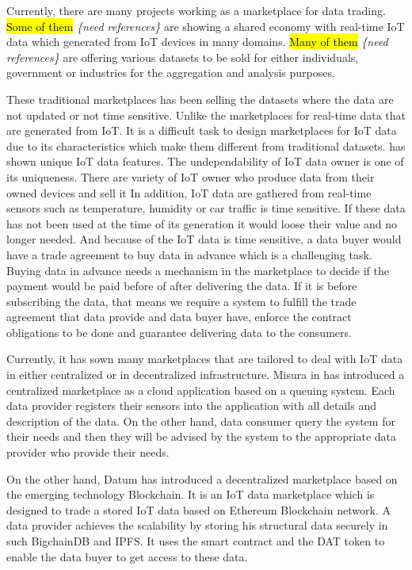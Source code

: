 \documentclass[letterpaper, 10 pt, conference]{ieeeconf}  %
\newcommand{\mycomment}[2]{\hl{#1} {{\leavevmode\smaller\color{red}\itshape\{#2\}}}}
\begin{document}
Currently, there are many projects working as a marketplace for data trading. 
\mycomment{Some of them}{need references} are showing a shared economy with real-time IoT data which generated from IoT devices in many domains. 
\mycomment{Many of them}{need references} are offering various datasets to be sold for either individuals, government or industries for the aggregation and analysis purposes. 

These traditional marketplaces has been selling the datasets where the data are not updated or not time sensitive. 
Unlike the marketplaces for real-time data that are generated from IoT. 
It is a difficult task to  design marketplaces for IoT data due to its characteristics which make them different from traditional datasets. \cite{misura} has shown unique IoT data features. The undependability of IoT data owner is one of its uniqueness. There are variety of IoT owner who produce data from their owned devices and sell it
 In addition, IoT data are gathered from real-time sensors such as temperature, humidity or car traffic is time sensitive. 
 If these data has not been used at the time of its generation it would loose their value and no longer needed. And because of the IoT data is time sensitive, a data buyer would have a trade agreement to buy data in advance which is a challenging task. Buying data in advance needs a mechanism in the marketplace to decide if the payment would be paid before of after delivering the data. If it is before subscribing the data, that means we require a system to fulfill the trade agreement that data provide and data buyer have, enforce the contract obligations to be done and guarantee delivering data to the consumers.

Currently, it has sown many marketplaces that are tailored to deal with IoT data in either centralized or in decentralized infrastructure. Misura in \cite{misura} has introduced a centralized marketplace as a cloud application based on a queuing system. Each data provider registers their sensors into the application with all details and description of the data. On the other hand, data consumer query the system for their needs and then  they will be advised by the system to the appropriate data provider who provide their needs. 

On the other hand, Datum \cite{24} has introduced a decentralized marketplace based on the emerging technology Blockchain. It is an IoT data marketplace which is designed to trade a stored IoT data based on Ethereum Blockchain network. A data provider achieves the scalability by storing his structural data securely in such BigchainDB and IPFS.  It uses the smart contract and the DAT token to enable the data buyer to get access to these data. 
\end{document}
